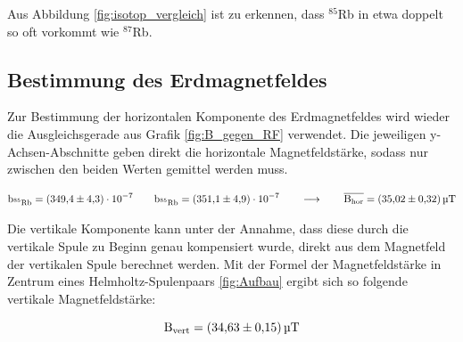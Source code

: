         \FloatBarrier

        \noindent

        Aus Abbildung \autoref{fig:isotop_vergleich} ist zu erkennen, dass ${}^{85}$Rb in etwa doppelt so oft vorkommt wie ${}^{87}$Rb.



        \subsection{Bestimmung des Erdmagnetfeldes}

        Zur Bestimmung der horizontalen Komponente des Erdmagnetfeldes wird wieder die Ausgleichsgerade aus Grafik \autoref{fig:B_gegen_RF} verwendet. Die jeweiligen y-Achsen-Abschnitte geben direkt die 
        horizontale Magnetfeldstärke, sodass nur zwischen den beiden Werten gemittel werden muss.
        
        \begin{equation*}
            \text{b}_{\text{${}^{85}$Rb}}= \num{349.4\pm4.3 e-7} \qquad \text{b}_{\text{${}^{85}$Rb}}= \num{351.1\pm4.9 e-7} \qquad \longrightarrow \qquad  \overline{\text{B}_{\text{hor}}} = \SI{35.02 +- 0.32}{\micro\tesla}
        \end{equation*}
    
        \noindent

        Die vertikale Komponente kann unter der Annahme, dass diese durch die vertikale Spule zu Beginn genau kompensiert wurde, direkt aus dem Magnetfeld der vertikalen Spule berechnet werden. Mit der Formel
        der Magnetfeldstärke in Zentrum eines Helmholtz-Spulenpaars \ref{fig:Aufbau} ergibt sich so folgende vertikale Magnetfeldstärke:

        \begin{equation*}
            \text{B}_{\text{vert}} = \SI{34.63 +- 0.15}{\micro\tesla}
        \end{equation*}

